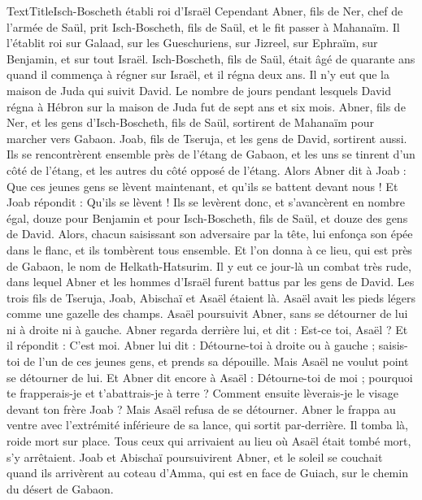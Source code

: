 \begin{multicols}{2}
TextTitle{Isch-Boscheth établi roi d'Israël}
Cependant Abner, fils de Ner, chef de l'armée de Saül, prit Isch-Boscheth, fils de Saül, et le fit passer à Mahanaïm.
Il l'établit roi sur Galaad, sur les Gueschuriens, sur Jizreel, sur Ephraïm, sur Benjamin, et sur tout Israël.
Isch-Boscheth, fils de Saül, était âgé de quarante ans quand il commença à régner sur Israël, et il régna deux ans. Il n'y eut que la maison de Juda qui suivit David.
Le nombre de jours pendant lesquels David régna à Hébron sur la maison de Juda fut de sept ans et six mois.
Abner, fils de Ner, et les gens d'Isch-Boscheth, fils de Saül, sortirent de Mahanaïm pour marcher vers Gabaon.
Joab, fils de Tseruja, et les gens de David, sortirent aussi. Ils se rencontrèrent ensemble près de l'étang de Gabaon, et les uns se tinrent d’un côté de l'étang, et les autres du côté opposé de l’étang.
Alors Abner dit à Joab : Que ces jeunes gens se lèvent maintenant, et qu'ils se battent devant nous ! Et Joab répondit : Qu'ils se lèvent !
Ils se levèrent donc, et s’avancèrent en nombre égal, douze pour Benjamin et pour Isch-Boscheth, fils de Saül, et douze des gens de David.
Alors, chacun saisissant son adversaire par la tête, lui enfonça son épée dans le flanc, et ils tombèrent tous ensemble. Et l'on donna à ce lieu, qui est près de Gabaon, le nom de Helkath-Hatsurim.
Il y eut ce jour-là un combat très rude, dans lequel Abner et les hommes d’Israël furent battus par les gens de David.
Les trois fils de Tseruja, Joab, Abischaï et Asaël étaient là. Asaël avait les pieds légers comme une gazelle des champs.
Asaël poursuivit Abner, sans se détourner de lui ni à droite ni à gauche.
Abner regarda derrière lui, et dit : Est-ce toi, Asaël ? Et il répondit : C’est moi.
Abner lui dit : Détourne-toi à droite ou à gauche ; saisis-toi de l'un de ces jeunes gens, et prends sa dépouille. Mais Asaël ne voulut point se détourner de lui.
Et Abner dit encore à Asaël : Détourne-toi de moi ; pourquoi te frapperais-je et t'abattrais-je à terre ? Comment ensuite lèverais-je le visage devant ton frère Joab ?
Mais Asaël refusa de se détourner. Abner le frappa au ventre avec l'extrémité inférieure de sa lance, qui sortit par-derrière. Il tomba là, roide mort sur place. Tous ceux qui arrivaient au lieu où Asaël était tombé mort, s'y arrêtaient.
Joab et Abischaï poursuivirent Abner, et le soleil se couchait quand ils arrivèrent au coteau d'Amma, qui est en face de Guiach, sur le chemin du désert de Gabaon.

\end{multicols}
